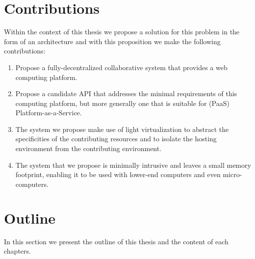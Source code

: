 \documentclass[12pt, titlepage]{uo_temp}
\begin{document}
     \section{Contributions}\label{contributions}
     Within the context of this thesis we propose a solution for this problem in the form
     of an architecture and with this proposition we make the following contributions:

     \begin{enumerate}[label={\bf Contribution \arabic*},
                       wide=\parindent,
                       leftmargin=\parindent,
                       rightmargin=\parindent]
     \item Propose a fully-decentralized collaborative system that provides a web
       computing platform.
     \item Propose a candidate API that addresses the minimal requirements of this
       computing platform, but more generally one that is suitable for (PaaS)
       Platform-as-a-Service.
     \item The system we propose make use of light virtualization to abstract the
       specificities of the contributing resources and to isolate the hosting environment
       from the contributing environment.
     \item The system that we propose is minimally intrusive and leaves a small memory
       footprint, enabling it to be used with lower-end computers and even
       micro-computers.
     \end{enumerate}

     \section{Outline}

     In this section we present the outline of this thesis and the content of each
     chapters.
\end{document}
